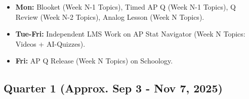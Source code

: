 \documentclass[11pt]{article}
\begin{document}
\begin{itemize}[leftmargin=*]
  \item \textbf{Mon:} Blooket (Week N-1 Topics), Timed AP Q (Week N-1 Topics), Q Review (Week N-2 Topics), Analog Lesson (Week N Topics).
  
  \item \textbf{Tue-Fri:} Independent LMS Work on AP Stat Navigator (Week N Topics: Videos + AI-Quizzes).
  
  \item \textbf{Fri:} AP Q Release (Week N Topics) on Schoology.
\end{itemize}

\subsection*{\textcolor{lynnmaroon}{Quarter 1 (Approx. Sep 3 - Nov 7, 2025)}}
\end{document}
